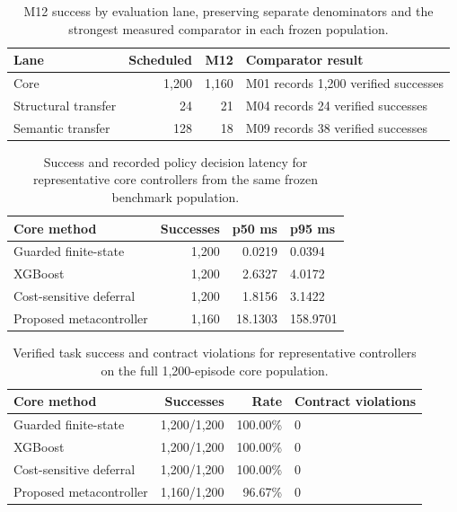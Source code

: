 \begin{table}[H]\centering\small
\begin{tabularx}{.96\linewidth}{lrrX}\toprule
Lane & Scheduled & M12 & Comparator result\\\midrule
Core & 1,200 & 1,160 & M01 records 1,200 verified successes\\
Structural transfer & 24 & 21 & M04 records 24 verified successes\\
Semantic transfer & 128 & 18 & M09 records 38 verified successes\\\bottomrule
\end{tabularx}\caption{M12 success by evaluation lane, preserving separate denominators and the strongest measured comparator in each frozen population.}\label{tab:lane-results}\end{table}

\begin{table}[H]\centering\small
\begin{tabularx}{.96\linewidth}{lrrX}\toprule
Core method & Successes & p50 ms & p95 ms\\\midrule
Guarded finite-state & 1,200 & 0.0219 & 0.0394\\
XGBoost & 1,200 & 2.6327 & 4.0172\\
Cost-sensitive deferral & 1,200 & 1.8156 & 3.1422\\
Proposed metacontroller & 1,160 & 18.1303 & 158.9701\\\bottomrule
\end{tabularx}\caption{Success and recorded policy decision latency for representative core controllers from the same frozen benchmark population.}\label{tab:latency-results}\end{table}

\begin{table}[H]\centering\small
\begin{tabularx}{.96\linewidth}{lrrX}\toprule
Core method & Successes & Rate & Contract violations\\\midrule
Guarded finite-state & 1,200/1,200 & 100.00\% & 0\\
XGBoost & 1,200/1,200 & 100.00\% & 0\\
Cost-sensitive deferral & 1,200/1,200 & 100.00\% & 0\\
Proposed metacontroller & 1,160/1,200 & 96.67\% & 0\\\bottomrule
\end{tabularx}\caption{Verified task success and contract violations for representative controllers on the full 1,200-episode core population.}\label{tab:core-results}\end{table}

